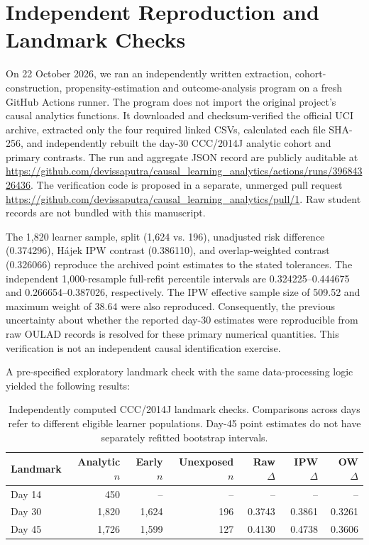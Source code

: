 \documentclass[10pt,a4paper]{article}
\begin{document}
\section{Independent Reproduction and Landmark Checks}
On 22 October 2026, we ran an independently written extraction, cohort-construction, propensity-estimation and outcome-analysis program on a fresh GitHub Actions runner. The program does not import the original project's causal analytics functions. It downloaded and checksum-verified the official UCI archive, extracted only the four required linked CSVs, calculated each file SHA-256, and independently rebuilt the day-30 CCC/2014J analytic cohort and primary contrasts. The run and aggregate JSON record are publicly auditable at
\url{https://github.com/devissaputra/causal_learning_analytics/actions/runs/39684326436}. The verification code is proposed in a separate, unmerged pull request \url{https://github.com/devissaputra/causal_learning_analytics/pull/1}. Raw student records are not bundled with this manuscript.

The 1,820 learner sample, split (1,624 vs. 196), unadjusted risk difference (0.374296), H\'ajek IPW contrast (0.386110), and overlap-weighted contrast (0.326066) reproduce the archived point estimates to the stated tolerances. The independent 1,000-resample full-refit percentile intervals are 0.324225--0.444675 and 0.266654--0.387026, respectively. The IPW effective sample size of 509.52 and maximum weight of 38.64 were also reproduced. Consequently, the previous uncertainty about whether the reported day-30 estimates were reproducible from raw OULAD records is resolved for these primary numerical quantities. This verification is not an independent causal identification exercise.

A pre-specified exploratory landmark check with the same data-processing logic yielded the following results:
\begin{table}[ht]\centering\small
\caption{Independently computed CCC/2014J landmark checks. Comparisons across days refer to different eligible learner populations. Day-45 point estimates do not have separately refitted bootstrap intervals.}
\begin{tabular}{lrrrrrr}\toprule
Landmark & Analytic $n$ & Early $n$ & Unexposed $n$ & Raw $\Delta$ & IPW $\Delta$ & OW $\Delta$ \\\midrule
Day 14 & 450 & -- & -- & -- & -- & -- \\
Day 30 & 1,820 & 1,624 & 196 & 0.3743 & 0.3861 & 0.3261 \\
Day 45 & 1,726 & 1,599 & 127 & 0.4130 & 0.4738 & 0.3606 \\\bottomrule
\end{tabular}\end{table}
\end{document}
